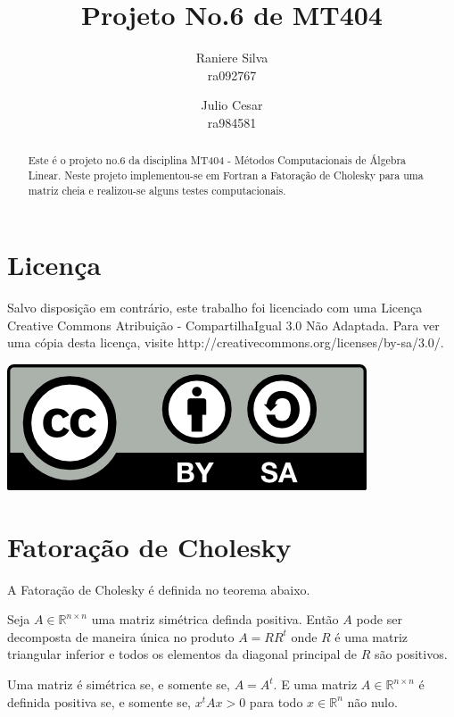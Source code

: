 \documentclass[12pt,a4paper]{article}
\begin{document}
\title{Projeto No.6 de MT404}
\author{Raniere Silva \\ ra092767  \and Julio Cesar \\ ra984581}
\maketitle
\begin{abstract}
    Este \'{e} o projeto no.6 da disciplina MT404 - M\'{e}todos Computacionais
    de \'{A}lgebra Linear. Neste projeto implementou-se em Fortran a Fatoração
    de Cholesky para uma matriz cheia e realizou-se alguns testes
    computacionais.
\end{abstract}
\tableofcontents
\lstlistoflistings
\section*{Licen\c{c}a}
Salvo disposi\c{c}\~{a}o em contr\'{a}rio, este trabalho foi licenciado com uma
Licen\c{c}a Creative Commons Atribui\c{c}\~{a}o - CompartilhaIgual 3.0 N\~{a}o
Adaptada. Para ver uma c\'{o}pia desta licen\c{c}a, visite
http://creativecommons.org/licenses/by-sa/3.0/.
\begin{center}
    \includegraphics{../figuras/cc-by-sa.png}
\end{center}
\newpage
\section{Fatora\c{c}\~{a}o de Cholesky}
A Fatoração de Cholesky é definida no teorema abaixo.
\begin{teo}
    Seja $A \in \mathbb{R}^{n \times n}$ uma matriz simétrica definda positiva.
    Então $A$ pode ser decomposta de maneira única no produto $A = R R^t$ onde
    $R$ é uma matriz triangular inferior e todos os elementos da diagonal
    principal de $R$ são positivos.
\end{teo}
Uma matriz é simétrica se, e somente se, $A = A^t$. E uma matriz $A \in
\mathbb{R}^{n \times n}$ é definida positiva se, e somente se, $x^t A x > 0$
para todo $x \in \mathbb{R}^n$ não nulo.
\end{document}
